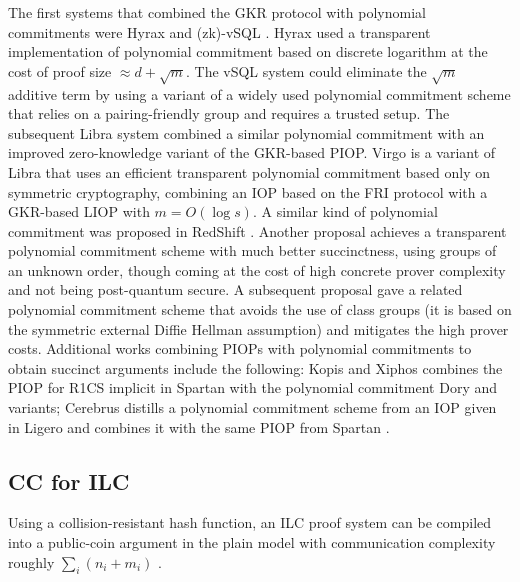 The first systems that combined the GKR protocol with polynomial commitments were Hyrax \cite{2018:SP:Doubly-efficient-zkSNARKs-without-trusted-setup} and (zk)-vSQL \cite{2017:SP:vSQL}. 
Hyrax used a transparent implementation of polynomial commitment based on discrete logarithm at the cost of proof size $\approx d+\sqrt{m}$.
The vSQL system could eliminate the $\sqrt{m}$ additive term by using a variant of a widely used polynomial commitment scheme \cite{2010:KZG:const-size-coms-to-poly-and-apps} that relies on a pairing-friendly group and requires a trusted setup. 
The subsequent Libra system \cite{2019:XZZPS:crypto:libra} combined a similar polynomial commitment with an improved zero-knowledge variant of the GKR-based PIOP. 
Virgo \cite{2020:ZXZS:virgo} is a variant of Libra that uses an efficient transparent polynomial commitment based only on symmetric cryptography, combining an IOP based on the FRI protocol with a GKR-based LIOP with $m=O(\log s)$. 
A similar kind of polynomial commitment was proposed in RedShift \cite{2019:KPV:redshift}. 
Another proposal \cite{2019:BFS:transparent-SNARKs-from-DARK-compilers} achieves a transparent polynomial commitment scheme with much better succinctness, using groups of an unknown order, though coming at the cost of high concrete prover complexity and not being post-quantum secure. 
A subsequent proposal \cite{DBLP:journals/iacr/Lee20b} gave a related polynomial commitment scheme that avoids the use of class groups (it is based on the symmetric external Diffie Hellman assumption) and mitigates the high prover costs. 
Additional works combining PIOPs with polynomial commitments to obtain succinct arguments include the following:
Kopis and Xiphos \cite{DBLP:journals/iacr/SettyL20} combines the PIOP for R1CS implicit in Spartan \cite{setty2020spartan} with the polynomial commitment Dory \cite{DBLP:journals/iacr/Lee20b} and variants;
Cerebrus \cite{2021:LSTW:eprint:linear-time-ZK-SNARKs-for-R1CS} distills a polynomial commitment scheme from an IOP given in Ligero \cite{2017:CCS:Ligero} and combines it with the same PIOP from Spartan \cite{setty2020spartan}.


\subsection{CC for ILC}
\label{sec:CC-ILC}
Using a collision-resistant hash function, an ILC proof system can be compiled into a public-coin argument in the plain model with communication complexity roughly $\sum_i (n_i+m_i)$ \cite{2017:BCGGHJ:linear-time-ZKPs-arithm-circ-sat}.
